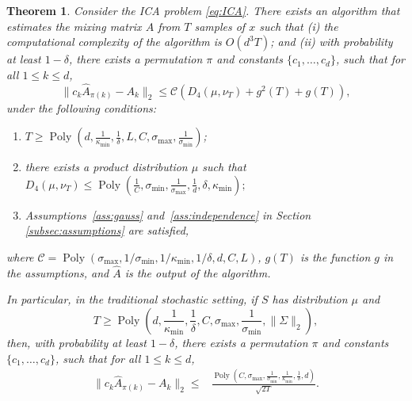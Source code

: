 \documentclass{article} %
\DeclareMathOperator{\pol}{Poly}
\newcommand{\poly}[1]{\pol\left(#1\right)}
\newtheorem{thm}[lemma]{Theorem}
\theoremstyle{definition}
\begin{document}
\begin{thm}
\label{thm:finalRes} Consider the ICA problem \eqref{eq:ICA}. There exists an algorithm that estimates the mixing matrix $A$ from $T$ samples of $x$ such that (i) the computational complexity of the algorithm is $O(d^3 T)$; and (ii) with probability at least $1-\delta$, there exists a permutation $\pi$ and constants $\{c_1,\ldots,c_d\}$, such that for all $1\le k\le d$,
\[
\| c_k\hat{A}_{\pi(k)} - A_k\|_2 \le \mathcal{C}\left(D_4(\mu, \nu_T)+g^2(T) +g(T) \right),
\]
under the following conditions:
\begin{enumerate}
\vspace{-2mm}
\item $T \ge \poly{d, \frac{1}{\kappa_{\min}}, \frac{1}{\delta}, L, C, \sigma_{\max}, \frac{1}{\sigma_{\min}}}$;
\vspace{-2mm}
\item  there exists a product distribution  $\mu$  such that 
$D_4(\mu, \nu_T) \le \poly{\frac{1}{C},  \sigma_{\min},  \frac{1}{\sigma_{\max}},\frac{1}{d}, \delta, \kappa_{\min}};$
\vspace{-2mm}
\item  Assumptions~\ref{ass:gauss} and~\ref{ass:independence} in Section \ref{subsec:assumptions} are satisfied,
\end{enumerate}
where $\mathcal{C} = \poly{\sigma_{\max}, 1/\sigma_{\min}, 1/\kappa_{\min},1/\delta, d, C, L}$, $g(T)$ is the function $g$ in the assumptions, and $\hat{A}$ is the output of the algorithm.

In particular, in the traditional stochastic setting, if $S$ has distribution $\mu$ and
\[
T \ge \poly{d, \frac{1}{\kappa_{\min}}, \frac{1}{\delta}, C, \sigma_{\max}, \frac{1}{\sigma_{\min}}, \|\Sigma\|_2},
\]
then, with probability at least $1-\delta$, there exists a permutation $\pi$ and constants $\{c_1,\ldots,c_d\}$, such that for all $1\le k\le d$,
\vspace{-2mm}
\begin{align*}
 \| c_k\hat{A}_{\pi(k)} - A_k\|_2 \le 
& \frac{\poly{C, \sigma_{\max}, \frac{1}{\sigma_{\min}}, \frac{1}{\kappa_{\min}},\frac{1}{\delta}, d}}{\sqrt{2T}}.
\end{align*}
\end{thm}
\end{document}
